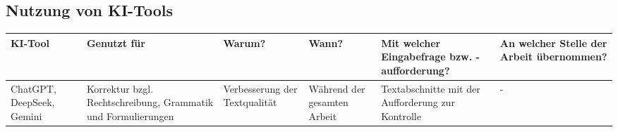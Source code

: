 %
%


\subsection*{Nutzung von KI-Tools}

\begin{table}
	\begin{small}	
	\begin{tabularx}{\textwidth}{|X|X|X|X|X|X|}
		\hline		
		\textbf{KI-Tool} & \textbf{Genutzt für} & \textbf{Warum?} & \textbf{Wann?} & \textbf{Mit welcher Eingabefrage bzw. -aufforderung?} & \textbf{An welcher Stelle der Arbeit übernommen?}\\
		\hline
		ChatGPT, DeepSeek, Gemini & Korrektur bzgl. Rechtschreibung, Grammatik und Formulierungen & Verbesserung der Textqualität & Während der gesamten Arbeit & Textabschnitte mit der Aufforderung zur Kontrolle & - \\
		\hline
	\end{tabularx}
	\end{small}
\end{table}

